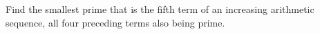 Find the smallest prime that is the fifth term of an increasing arithmetic sequence, all four preceding terms also being prime.